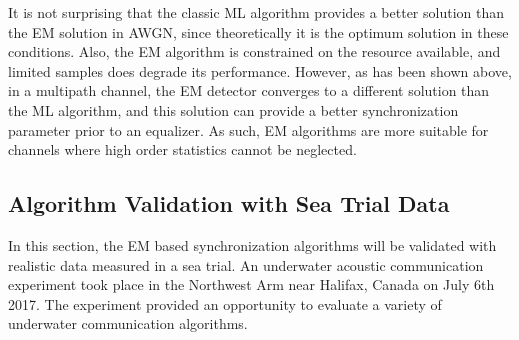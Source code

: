 \documentclass[journal,comsoc, onecolumn, 12pt,draftclsnofoot]{IEEEtran} %
\begin{document}
It is not surprising that the classic ML algorithm provides a better solution than the EM solution in AWGN, since theoretically it is the optimum solution in these conditions. Also, the EM algorithm is constrained on the resource available, and limited samples does degrade its performance. However, as has been shown above, in a multipath channel, the EM detector converges to a different solution than the ML algorithm, and this solution can provide a better synchronization parameter prior to an equalizer. As such, EM algorithms are more suitable for channels where high order statistics cannot be neglected.  

% 
% 

\subsection{Algorithm Validation with Sea Trial Data }
\label{sec:per_sea}
In this section, the EM based synchronization algorithms will be validated with realistic data measured in a sea trial. 
An underwater acoustic communication experiment took place in the Northwest Arm near Halifax, Canada on July 6th 2017. 
The experiment provided an opportunity to evaluate a variety of underwater communication algorithms.
\end{document}
